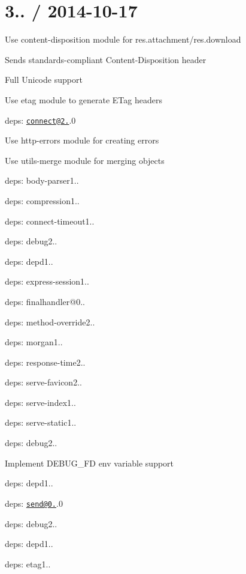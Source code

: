 {\ttfamily \section*{3.. / 2014-\/10-\/17 }}

{\ttfamily }

{\ttfamily 
\begin{DoxyItemize}
\item Use {\ttfamily content-\/disposition} module for {\ttfamily res.\+attachment}/{\ttfamily res.\+download}
\begin{DoxyItemize}
\item Sends standards-\/compliant {\ttfamily Content-\/\+Disposition} header
\item Full Unicode support
\end{DoxyItemize}
\item Use {\ttfamily etag} module to generate {\ttfamily E\+Tag} headers
\item deps\+: \href{mailto:connect@2.27}{\tt connect@2.}.0
\begin{DoxyItemize}
\item Use {\ttfamily http-\/errors} module for creating errors
\item Use {\ttfamily utils-\/merge} module for merging objects
\item deps\+: body-\/parser1..
\item deps\+: compression1..
\item deps\+: connect-\/timeout1..
\item deps\+: debug2..
\item deps\+: depd1..
\item deps\+: express-\/session1..
\item deps\+: finalhandler@0..
\item deps\+: method-\/override2..
\item deps\+: morgan1..
\item deps\+: response-\/time2..
\item deps\+: serve-\/favicon2..
\item deps\+: serve-\/index1..
\item deps\+: serve-\/static1..
\end{DoxyItemize}
\item deps\+: debug2..
\begin{DoxyItemize}
\item Implement {\ttfamily D\+E\+B\+U\+G\+\_\+\+FD} env variable support
\end{DoxyItemize}
\item deps\+: depd1..
\item deps\+: \href{mailto:send@0.10}{\tt send@0.}.0
\begin{DoxyItemize}
\item deps\+: debug2..
\item deps\+: depd1..
\item deps\+: etag1..
\end{DoxyItemize}
\end{DoxyItemize}}

